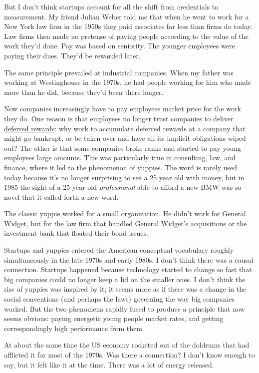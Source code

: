 \documentclass[12pt]{book}
\begin{document}
But I don't think startups account for all the shift from credentials to
measurement. My friend Julian Weber told me that when he went to work
for a New York law firm in the 1950s they paid associates far less than
firms do today. Law firms then made no pretense of paying people
according to the value of the work they'd done. Pay was based on
seniority. The younger employees were paying their dues. They'd be
rewarded later.

The same principle prevailed at industrial companies. When my father was
working at Westinghouse in the 1970s, he had people working for him who
made more than he did, because they'd been there longer.

Now companies increasingly have to pay employees market price for the
work they do. One reason is that employees no longer trust companies to
deliver \href{ladder.html}{deferred rewards}: why work to accumulate
deferred rewards at a company that might go bankrupt, or be taken over
and have all its implicit obligations wiped out? The other is that some
companies broke ranks and started to pay young employees large amounts.
This was particularly true in consulting, law, and finance, where it led
to the phenomenon of yuppies. The word is rarely used today because it's
no longer surprising to see a 25 year old with money, but in 1985 the
sight of a 25 year old \emph{professional} able to afford a new BMW was
so novel that it called forth a new word.

The classic yuppie worked for a small organization. He didn't work for
General Widget, but for the law firm that handled General Widget's
acquisitions or the investment bank that floated their bond issues.

Startups and yuppies entered the American conceptual vocabulary roughly
simultaneously in the late 1970s and early 1980s. I don't think there
was a causal connection. Startups happened because technology started to
change so fast that big companies could no longer keep a lid on the
smaller ones. I don't think the rise of yuppies was inspired by it; it
seems more as if there was a change in the social conventions (and
perhaps the laws) governing the way big companies worked. But the two
phenomena rapidly fused to produce a principle that now seems obvious:
paying energetic young people market rates, and getting correspondingly
high performance from them.

At about the same time the US economy rocketed out of the doldrums that
had afflicted it for most of the 1970s. Was there a connection? I don't
know enough to say, but it felt like it at the time. There was a lot of
energy released.
\end{document}
